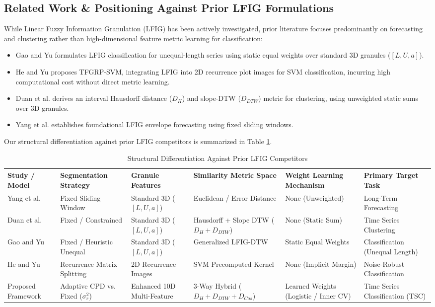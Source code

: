 \documentclass[conference]{IEEEtran}
\begin{document}
\subsection{Related Work \& Positioning Against Prior LFIG Formulations}
While Linear Fuzzy Information Granulation (LFIG) has been actively investigated, prior literature focuses predominantly on forecasting and clustering rather than high-dimensional feature metric learning for classification:
\begin{itemize}
    \item Gao and Yu \cite{gao2019} formulates LFIG classification for unequal-length series using static equal weights over standard 3D granules ($[L, U, a]$).
    \item He and Yu \cite{he2023} proposes TFGRP-SVM, integrating LFIG into 2D recurrence plot images for SVM classification, incurring high computational cost without direct metric learning.
    \item Duan et al. \cite{duan2018} derives an interval Hausdorff distance ($D_H$) and slope-DTW ($D_{DTW}$) metric for clustering, using unweighted static sums over 3D granules.
    \item Yang et al. \cite{yang2017} establishes foundational LFIG envelope forecasting using fixed sliding windows.
\end{itemize}

Our structural differentiation against prior LFIG competitors is summarized in Table \ref{tab:structural_diff}.

\begin{table}[htbp]
\caption{Structural Differentiation Against Prior LFIG Competitors}
\label{tab:structural_diff}
\centering
\begin{tabular}{|l|l|l|l|l|l|}
\hline
Study / Model & Segmentation Strategy & Granule Features & Similarity Metric Space & Weight Learning Mechanism & Primary Target Task \\ \hline
Yang et al. \cite{yang2017} & Fixed Sliding Window & Standard 3D ($[L, U, a]$) & Euclidean / Error Distance & None (Unweighted) & Long-Term Forecasting \\ \hline
Duan et al. \cite{duan2018} & Fixed / Constrained & Standard 3D ($[L, U, a]$) & Hausdorff + Slope DTW ($D_H + D_{DTW}$) & None (Static Sum) & Time Series Clustering \\ \hline
Gao and Yu \cite{gao2019} & Fixed / Heuristic Unequal & Standard 3D ($[L, U, a]$) & Generalized LFIG-DTW & Static Equal Weights & Classification (Unequal Length) \\ \hline
He and Yu \cite{he2023} & Recurrence Matrix Splitting & 2D Recurrence Images & SVM Precomputed Kernel & None (Implicit Margin) & Noise-Robust Classification \\ \hline
Proposed Framework & Adaptive CPD vs. Fixed ($\sigma^2_r$) & Enhanced 10D Multi-Feature & 3-Way Hybrid ($D_H + D_{DTW} + D_{Cos}$) & Learned Weights (Logistic / Inner CV) & Time Series Classification (TSC) \\ \hline
\end{tabular}
\end{table}
\end{document}
